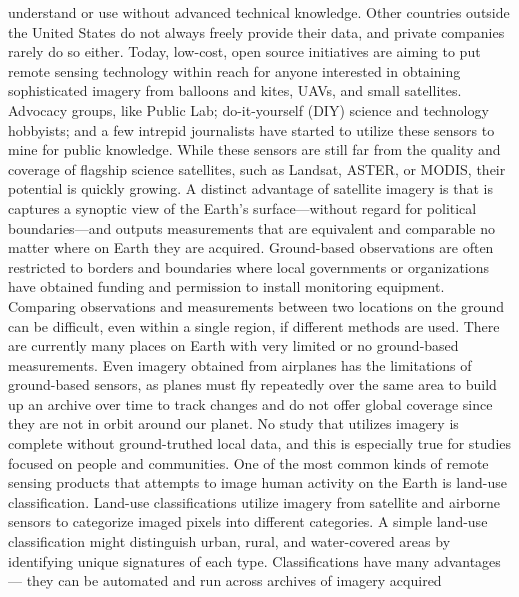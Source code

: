 understand or use without advanced technical knowledge. Other countries
outside the United States do not always freely provide their data, and private
companies rarely do so either. Today, low-cost, open source initiatives
are aiming to put remote sensing technology within reach for anyone interested
in obtaining sophisticated imagery from balloons and kites, UAVs, and
small satellites. Advocacy groups, like Public Lab; do-it-yourself (DIY) science
and technology hobbyists; and a few intrepid journalists have started
to utilize these sensors to mine for public knowledge. While these sensors
are still far from the quality and coverage of flagship science satellites, such
as Landsat, ASTER, or MODIS, their potential is quickly growing.
A distinct advantage of satellite imagery is that is captures a synoptic view
of the Earth's surface—without regard for political boundaries—and outputs
measurements that are equivalent and comparable no matter where
on Earth they are acquired. Ground-based observations are often restricted
to borders and boundaries where local governments or organizations have
obtained funding and permission to install monitoring equipment. Comparing
observations and measurements between two locations on the
ground can be difficult, even within a single region, if different methods
are used. There are currently many places on Earth with very limited or no
ground-based measurements. Even imagery obtained from airplanes has
the limitations of ground-based sensors, as planes must fly repeatedly over
the same area to build up an archive over time to track changes and do not
offer global coverage since they are not in orbit around our planet.
No study that utilizes imagery is complete without ground-truthed local
data, and this is especially true for studies focused on people and communities.
One of the most common kinds of remote sensing products that
attempts to image human activity on the Earth is land-use classification.
Land-use classifications utilize imagery from satellite and airborne sensors
to categorize imaged pixels into different categories. A simple land-use
classification might distinguish urban, rural, and water-covered areas by
identifying unique signatures of each type. Classifications have many advantages—
they can be automated and run across archives of imagery acquired

